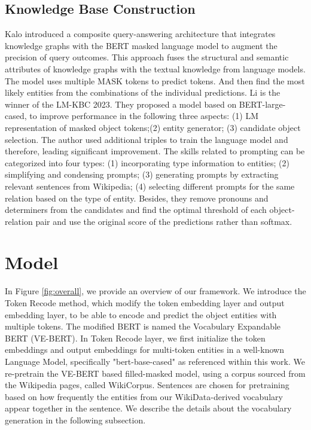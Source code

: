 \documentclass[]{ceurart}
\begin{document}
\subsection{Knowledge Base Construction}
Kalo   \cite{pan_knowlybert_2020} introduced a composite query-answering architecture that integrates knowledge graphs with the BERT masked language model to augment the precision of query outcomes. This approach fuses the structural and semantic attributes of knowledge graphs with the textual knowledge from language models. The model uses multiple MASK tokens to predict tokens. And then find the most likely entities from the combinations of the individual predictions.  Li \cite{li_task-specific_2022} is the winner of the LM-KBC 2023. They proposed a model based on BERT-large-cased, to improve performance in the following three aspects: (1) LM representation of masked object tokens;(2) entity generator; (3) candidate object selection.  The author used additional triples to train the language model and therefore, leading significant improvement. The skills related to prompting can be categorized into four types: (1) incorporating type information to entities; (2) simplifying and condensing prompts; (3) generating prompts by extracting relevant sentences from Wikipedia; (4) selecting different prompts for the same relation based on the type of entity. Besides, they remove pronouns and determiners from the candidates and find the optimal threshold of each object-relation pair and use the original score of the predictions rather than softmax. 










\section{Model}
In Figure \ref{fig:overall}, we provide an overview of our framework. 
We introduce the Token Recode method, which modify the token embedding layer and output embedding layer, to be able to encode and predict the object entities with multiple tokens. The modified BERT is named the Vocabulary Expandable BERT (VE-BERT). In Token Recode layer, we first initialize the token embeddings and output embeddings for multi-token entities in a well-known Language Model, specifically "bert-base-cased" as referenced within this work.  We re-pretrain the VE-BERT based filled-masked model, using a corpus sourced from the Wikipedia pages, called WikiCorpus. Sentences are chosen for pretraining based on how frequently the entities from our WikiData-derived vocabulary appear together in the sentence. We describe the details about the vocabulary generation in the following subsection. 
\end{document}
